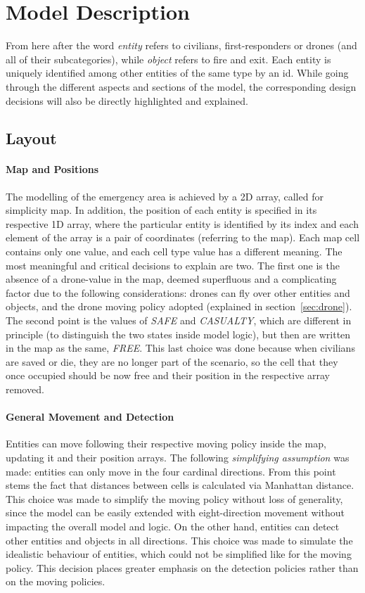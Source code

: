 
\section{Model Description}
From here after the word \textit{entity} refers to civilians, first-responders or drones (and all of their subcategories), while \textit{object} refers to fire and exit. Each entity is uniquely identified among other entities of the same type by an id. While going through the different aspects and sections of the model, the corresponding design decisions will also be directly highlighted and explained.


\subsection{Layout}
\paragraph{Map and Positions}
\label{sec:map}
The modelling of the emergency area is achieved by a 2D array, called for simplicity map. In addition, the position of each entity is specified in its respective 1D array, where the particular entity is identified by its index and each element of the array is a pair of coordinates (referring to the map).\newline
Each map cell contains only one value, and each cell type value has a different meaning. The most meaningful and critical decisions to explain are two. The first one is the absence of a drone-value in the map, deemed superfluous and a complicating factor due to the following considerations: drones can fly over other entities and objects, and the drone moving policy adopted (explained in section~\ref{sec:drone}). The second point is the values of \textit{SAFE} and \textit{CASUALTY}, which are different in principle (to distinguish the two states inside model logic), but then are written in the map as the same, \textit{FREE}. This last choice was done because when civilians are saved or die, they are no longer part of the scenario, so the cell that they once occupied should be now free and their position in the respective array removed.
\paragraph{General Movement and Detection}
Entities can move following their respective moving policy inside the map, updating it and their position arrays. The following \textit{simplifying assumption} was made: entities can only move in the four cardinal directions. From this point stems the fact that distances between cells is calculated via Manhattan distance. This choice was made to simplify the moving policy without loss of generality, since the model can be easily extended with eight-direction movement without impacting the overall model and logic. On the other hand, entities can detect other entities and objects in all directions. This choice was made to simulate the idealistic behaviour of entities, which could not be simplified like for the moving policy. This decision places greater emphasis on the detection policies rather than on the moving policies.


